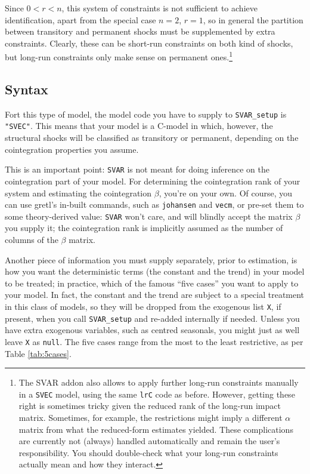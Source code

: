 \documentclass[a4paper,10pt]{article}
\newcommand{\app}[1]{\textsf{#1}}
\newcommand{\cmd}[1]{\texttt{#1}}
\begin{document}
Since $0 < r < n$, this system of constraints is not sufficient to
achieve identification, apart from the special case $n =2$, $r=1$, so
in general the partition between transitory and permanent shocks must
be supplemented by extra constraints. Clearly, these can be short-run
constraints on both kind of shocks, but long-run constraints only make
sense on permanent ones.\footnote{The SVAR addon also allows to apply 
further long-run constraints manually in a \texttt{SVEC} model, using the
same \texttt{lrC} code as before. However, getting these right is sometimes
tricky given the reduced rank of the long-run impact matrix. Sometimes, for
example, the restrictions might imply a different $\alpha$ matrix from what 
the reduced-form estimates yielded. These complications are currently not 
(always) handled automatically and remain the user's responsibility. You 
should double-check what your long-run constraints actually mean and how 
they interact.}


\subsection{Syntax}
\label{sec:KPSWsyntax}

Fort this type of model, the model code you have to supply to
\cmd{SVAR\_setup} is \cmd{"SVEC"}. This means that your model is a
C-model in which, however, the structural shocks will be classified as
transitory or permanent, depending on the cointegration properties you
assume.

This is an important point: \texttt{SVAR} is not meant for doing
inference on the cointegration part of your model. For determining the
cointegration rank of your system and estimating the cointegration
$\beta$, you're on your own. Of course, you can use \app{gretl}'s
in-built commands, such as \cmd{johansen} and \cmd{vecm}, or pre-set
them to some theory-derived value: \texttt{SVAR} won't care, and will
blindly accept the matrix $\beta$ you supply it; the cointegration
rank is implicitly assumed as the number of columns of the $\beta$
matrix.

Another piece of information you must supply separately, prior to
estimation, is how you want the deterministic terms (the constant and
the trend) in your model to be treated; in practice, which of the
famous ``five cases'' you want to apply to your model. In fact, the
constant and the trend are subject to a special treatment in this
class of models, so they will be dropped from the exogenous list
\texttt{X}, if present, when you call \cmd{SVAR\_setup} and re-added
internally if needed. Unless you have extra exogenous variables, such
as centred seasonals, you might just as well leave \texttt{X} as
\texttt{null}. The five cases range from the most to the least
restrictive, as per Table \ref{tab:5cases}.
\end{document}
